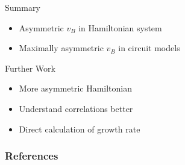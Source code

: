 \documentclass{beamer}
\begin{document}
\begin{frame}
Summary
\begin{itemize}
	\item Asymmetric $v_B$ in Hamiltonian system
	\item Maximally asymmetric $v_B$ in circuit models
\end{itemize}
Further Work
\begin{itemize}
	\item More asymmetric Hamiltonian
	\item Understand correlations better
	\item Direct calculation of growth rate
\end{itemize}
\end{frame}

\begin{frame}
\nocite{}
\frametitle{References}
\footnotesize{
	
	
}
\end{frame}
\end{document}
